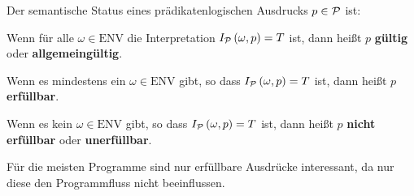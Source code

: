 {\begin{comment}
\textit{Lösung:}
\begin{align*}
&\quad \I{P}{\omega}{(\texists y) lt?(y,x)} \\
&\Lra \texists \omega', \omega \sim_{\u{y}} \omega': \; \Iu{P}{\omega'}{lt?(y,x)} \\
&\Lra \texists \omega', \omega \sim_{\u{y}} \omega': \; \text{lt?}(\Iu{P}{\omega'}{y},\Iu{P}{\omega'}{x}) \\
&\Lra \texists \omega', \omega \sim_{\u{y}} \omega': \; \text{lt?}(\omega'(\tu{y}),\omega'(\tu{x})) \\
&\Lra \texists \omega', \omega \sim_{\u{y}} \omega': \; \text{lt?}(\omega'(\tu{y}),0) \\
&\Lra \texists \omega', \omega \sim_{\u{y}} \omega': \; \omega'(\tu{y}) < 0
\intertext{Da $\omega'(\tu{y}) \in \N_0$, d.h. $\omega'(\tu{y}) \geq 0$, gibt es keinen Wert den $\omega'(\tu{y})$ annehmen könnte um das Prädikat zu erfüllen.}
&\Lra F
\end{align*}
\end{\whichenum}
\end{bsp}
\ifthenelse{\boolean{long}}{}{\end{comment}}

\begin{defn}
Der semantische Status eines prädikatenlogischen Ausdrucks $p \in \mathcal{P}$ ist:
\begin{\whichitem}
\item Wenn für alle $\omega \in \text{ENV}$ die Interpretation $I_{\mathcal{P}}\left(\omega,p\right)=T$ ist, dann heißt $p$ \textbf{gültig} oder \textbf{allgemeingültig}.
\item Wenn es mindestens ein $\omega \in \text{ENV}$ gibt, so dass $I_{\mathcal{P}}\left(\omega,p\right)=T$ ist, dann heißt $p$ \textbf{erfüllbar}.
\item Wenn es kein $\omega \in \text{ENV}$ gibt, so dass $I_{\mathcal{P}}\left(\omega,p\right)=T$ ist, dann heißt $p$ \textbf{nicht erfüllbar} oder \textbf{unerfüllbar}.
\end{\whichitem}
\end{defn}

Für die meisten Programme sind nur erfüllbare Ausdrücke interessant, da nur diese den Programmfluss nicht beeinflussen.

